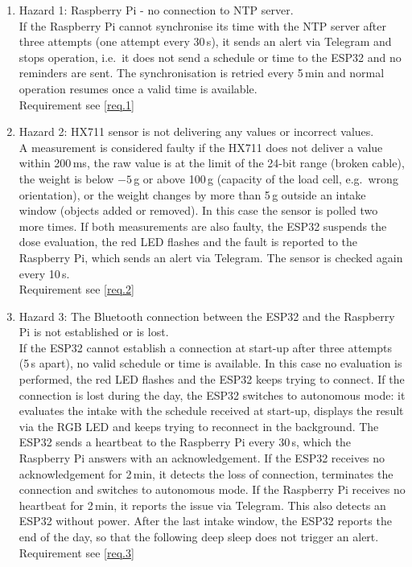 	\begin{enumerate}
		\item Hazard 1: Raspberry Pi - no connection to NTP server. \\
		If the Raspberry Pi cannot synchronise its time with the NTP server after three attempts (one attempt every 30\,s),
		it sends an alert via Telegram and stops operation, i.e.\ it does not send a schedule or time to the ESP32 and
		no reminders are sent. The synchronisation is retried every 5\,min and normal operation resumes once a valid time
		is available. \\
			Requirement see \ref{req.1} \\
		\item Hazard 2: HX711 sensor is not delivering any values or incorrect values. \\
		A measurement is considered faulty if the HX711 does not deliver a value within 200\,ms, the raw value is at
		the limit of the 24-bit range (broken cable), the weight is below $-5$\,g or above 100\,g (capacity of the load cell,
		e.g.\ wrong orientation), or the weight changes by more than 5\,g outside an intake window
		(objects added or removed). In this case the sensor is polled two more times. If both measurements are also
		faulty, the ESP32 suspends the dose evaluation, the red LED flashes and the fault is reported to the Raspberry Pi,
		which sends an alert via Telegram. The sensor is checked again every 10\,s. \\
			Requirement see \ref{req.2} \\
		\item Hazard 3: The Bluetooth connection between the ESP32 and the Raspberry Pi is not established or is lost. \\
		If the ESP32 cannot establish a connection at start-up after three attempts (5\,s apart), no valid schedule or
		time is available. In this case no evaluation is performed, the red LED flashes and the ESP32 keeps trying to
		connect. If the connection is lost during the day, the ESP32 switches to autonomous mode: it evaluates the intake
		with the schedule received at start-up, displays the result via the RGB LED and keeps trying to reconnect in
		the background. The ESP32 sends a heartbeat to the Raspberry Pi every 30\,s, which the Raspberry Pi answers with an
		acknowledgement. If the ESP32 receives no acknowledgement for 2\,min, it detects the loss of connection, terminates
		the connection and switches to autonomous mode. If the Raspberry Pi receives no heartbeat for 2\,min,
		it reports the issue via Telegram. This also detects an ESP32 without power. After the last intake
		window, the ESP32 reports the end of the day, so that the following deep sleep does not trigger an alert. \\
			Requirement see \ref{req.3} \\
	\end{enumerate}

